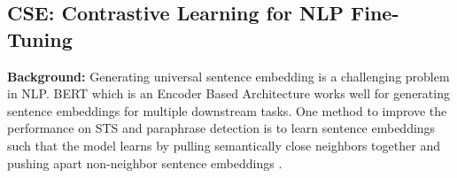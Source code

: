 \documentclass{article}
\begin{document}







\subsection{CSE: Contrastive Learning for NLP Fine-Tuning \cite{simcse}}

\textbf{Background:}  Generating universal sentence embedding is a challenging problem in NLP. BERT which is an Encoder Based Architecture works well for generating sentence embeddings for multiple downstream tasks. One method to improve the performance on STS and paraphrase detection is to learn sentence embeddings such that the model learns by pulling semantically close neighbors together and pushing apart non-neighbor sentence embeddings \cite{simcse}.
\end{document}
